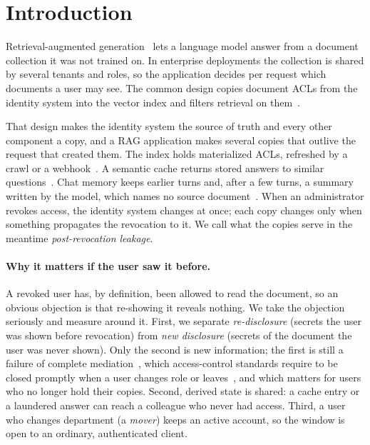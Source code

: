 \section{Introduction}
\label{sec:intro}

Retrieval-augmented generation~\cite{lewis2020rag} lets a language model answer from a document
collection it was not trained on. In enterprise deployments the collection is shared by several
tenants and roles, so the application decides per request which documents a user may see. The
common design copies document ACLs from the identity system into the vector index and filters
retrieval on them~\cite{jeong2025permissionrag,chen2025integrating,zhong2026honeybee,doc_azure_trimming}.

That design makes the identity system the source of truth and every other component a copy, and
a RAG application makes several copies that outlive the request that created them. The index holds
materialized ACLs, refreshed by a crawl or a webhook~\cite{doc_graph_connectors}. A semantic cache
returns stored answers to similar questions~\cite{bang2023gptcache,doc_redisvl}. Chat memory keeps
earlier turns and, after a few turns, a summary written by the model, which names no source
document~\cite{doc_langchain_summary,doc_llamaindex_memory,packer2023memgpt}. When an administrator
revokes access, the identity system changes at once; each copy changes only when something
propagates the revocation to it. We call what the copies serve in the meantime
\emph{post-revocation leakage}.

\paragraph{Why it matters if the user saw it before.}
A revoked user has, by definition, been allowed to read the document, so an obvious objection is
that re-showing it reveals nothing. We take the objection seriously and measure around it. First,
we separate \emph{re-disclosure} (secrets the user was shown before revocation) from \emph{new
disclosure} (secrets of the document the user was never shown). Only the second is new information; the first is still a failure of complete
mediation~\cite{saltzer1975protection}, which access-control standards require to be closed
promptly when a user changes role or leaves~\cite{nist80053r5}, and which matters for users who no
longer hold their copies. Second, derived state is shared: a cache entry or a laundered answer can
reach a colleague who never had access. Third, a user who changes department (a \emph{mover})
keeps an active account, so the window is open to an ordinary, authenticated client.


